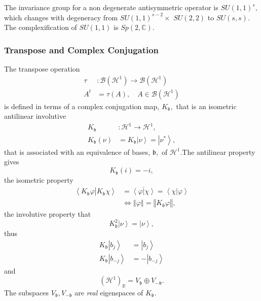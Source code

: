 \documentclass[aps,preprint]{revtex4}%
\begin{document}
The invariance group for a non degenerate antisymmetric operator is $SU\left(
1,1\right)  ^{s},$ which changes with degeneracy from $SU\left(  1,1\right)
^{s-2}\times$ $SU\left(  2,2\right)  $ to $SU\left(  s,s\right)  .$ The
complexification of $SU\left(  1,1\right)  $ is $Sp\left(  2,\mathbb{C}%
\right)  .$

\subsubsection{Transpose and Complex Conjugation}

The transpose operation
\begin{align}
\tau &  :\mathcal{B}\left(  \mathcal{H}^{1}\right)  \rightarrow\mathcal{B}%
\left(  \mathcal{H}^{1}\right) \nonumber\\
A^{t}  &  =\tau\left(  A\right)  ,\quad A\in\mathcal{B}\left(  \mathcal{H}%
^{1}\right)
\end{align}
is defined in terms of a complex conjugation map, $K_{\mathfrak{b}},$ that is
an isometric antilinear involutive
\begin{align}
K_{\mathfrak{b}}  &  :\mathcal{H}^{1}\rightarrow\mathcal{H}^{1},\nonumber\\
K_{\mathfrak{b}}\left(  \nu\right)   &  =K_{\mathfrak{b}}\left\vert
\nu\right\rangle =\left\vert \nu^{\ast}\right\rangle ,
\end{align}
that is associated with an equivalence of bases, $\mathfrak{b},$ of
$\mathcal{H}^{1}.$The antilinear property gives
\begin{equation}
K_{\mathfrak{b}}\left(  i\right)  =-i,
\end{equation}
the isometric property
\begin{align}
\left\langle \left.  K_{\mathfrak{b}}\varphi\right\vert K_{\mathfrak{b}}%
\chi\right\rangle  &  =\overline{\left\langle \left.  \varphi\right\vert
\chi\right\rangle }=\left\langle \left.  \chi\right\vert \varphi\right\rangle
\\
&  \Leftrightarrow\left\Vert \varphi\right\Vert =\left\Vert K_{\mathfrak{b}%
}\varphi\right\Vert ,
\end{align}
the involutive property that
\begin{equation}
K_{\mathfrak{b}}^{2}\left\vert \nu\right\rangle =\left\vert \nu\right\rangle ,
\end{equation}
thus
\begin{align}
K_{\mathfrak{b}}\left\vert b_{j}\right\rangle  &  =\left\vert b_{j}%
\right\rangle \nonumber\\
K_{\mathfrak{b}}\left\vert b_{-j}\right\rangle  &  =-\left\vert b_{-j}%
\right\rangle
\end{align}
and
\begin{equation}
\left(  \mathcal{H}^{1}\right)  _{\mathbb{R}}=V_{\mathfrak{b}}\oplus
V_{-\mathfrak{b}}.
\end{equation}
The subspaces $V_{\mathfrak{b}},V_{-\mathfrak{b}}$ are \emph{real }eigenspaces
of $K_{\mathfrak{b}}$.
\end{document}
